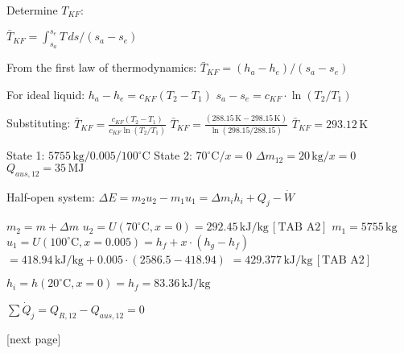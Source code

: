 Determine \( T_{KF} \):  

\( \bar{T}_{KF} = \int_{s_a}^{s_e} T \, ds / (s_a - s_e) \)  

From the first law of thermodynamics:  
\( \bar{T}_{KF} = (h_a - h_e) / (s_a - s_e) \)  

For ideal liquid:  
\( h_a - h_e = c_{KF} (T_2 - T_1) \)  
\( s_a - s_e = c_{KF} \cdot \ln(T_2 / T_1) \)  

Substituting:  
\( \bar{T}_{KF} = \frac{c_{KF} (T_2 - T_1)}{c_{KF} \ln(T_2 / T_1)} \)  
\( \bar{T}_{KF} = \frac{(288.15 \, \text{K} - 298.15 \, \text{K})}{\ln(298.15 / 288.15)} \)  
\( \bar{T}_{KF} = 293.12 \, \text{K} \)

State 1: \( 5755 \, \text{kg} / 0.005 / 100^\circ \text{C} \)  
State 2: \( 70^\circ \text{C} / x = 0 \)  
\( \Delta m_{12} = 20 \, \text{kg} / x = 0 \)  
\( Q_{aus,12} = 35 \, \text{MJ} \)  

Half-open system:  
\( \Delta E = m_2 u_2 - m_1 u_1 = \Delta m_i h_i + Q_{j} - \dot{W} \)  

\( m_2 = m + \Delta m \)  
\( u_2 = U(70^\circ \text{C}, x = 0) = 292.45 \, \text{kJ/kg} \, [\text{TAB A2}] \)  
\( m_1 = 5755 \, \text{kg} \)  
\( u_1 = U(100^\circ \text{C}, x = 0.005) = h_f + x \cdot (h_g - h_f) \)  
\( = 418.94 \, \text{kJ/kg} + 0.005 \cdot (2586.5 - 418.94) \)  
\( = 429.377 \, \text{kJ/kg} \, [\text{TAB A2}] \)  

\( h_i = h(20^\circ \text{C}, x = 0) = h_f = 83.36 \, \text{kJ/kg} \)  

\( \sum \dot{Q}_j = Q_{R,12} - Q_{aus,12} = 0 \)  

[next page]
